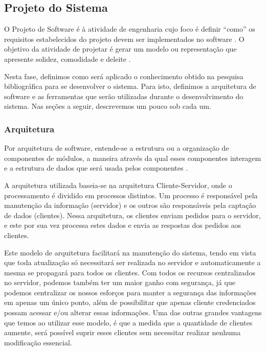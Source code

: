 \subsection{Projeto do Sistema}

O Projeto de Software é à atividade de engenharia cujo foco é definir ``como'' os requisitos estabelecidos do projeto devem ser implementados no software \cite{pressman2006engenharia}. O objetivo da  atividade de projetar é gerar um modelo ou representação que apresente solidez, comodidade e deleite \cite{pressman2006engenharia}. 

Nesta fase, definimos como será aplicado o conhecimento obtido na pesquisa bibliográfica para se desenvolver o sistema. Para isto, definimos a arquitetura de software e as ferramentas que serão utilizadas durante o desenvolvimento do sistema. Nas seções a seguir, descrevemos um pouco sob cada um.

\subsubsection{Arquitetura}
Por arquitetura de software, entende-se a estrutura ou a organização de componentes de módulos, a maneira através da qual esses componentes interagem e a estrutura de dados que será usada pelos componentes \cite{pressman2006engenharia}.

A arquitetura utilizada baseia-se na arquitetura Cliente-Servidor\cite{david2013everything}, onde o processamento é dividido em processos distintos. Um processo é responsável pela manutenção da informação (servidor) e os outros são responsáveis pela captação de dados (clientes). Nessa arquitetura, os clientes enviam pedidos para o servidor, e este por sua vez processa estes dados e envia as respostas dos pedidos aos clientes.

Este modelo de arquitetura facilitará na manutenção do sistema, tendo em vista que toda atualização só necessitará ser realizada no servidor e automaticamente a mesma se propagará para todos os clientes. Com todos os recursos centralizados no servidor, podemos também ter um maior ganho com segurança, já que podemos centralizar os nossos esforços para manter a segurança das informações em apenas um único ponto, além de possibilitar que apenas cliente credenciados possam acessar e/ou alterar essas informações. Uma das outras grandes vantagens que temos  ao utilizar esse modelo, é que a medida que a quantidade de clientes aumente, será possível suprir esses clientes sem necessitar realizar nenhuma modificação essencial.

